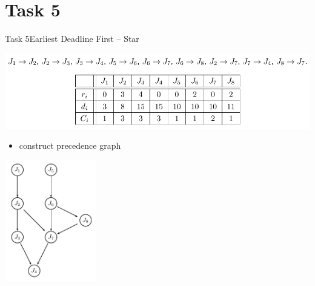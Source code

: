 
\section{Task 5}

\setcounter{task}{1}

\begin{frame}[allowframebreaks]{Task 5}{Earliest Deadline First – Star\vspace{0.5cm}}
  \begin{tasknoinc}
    \includegraphics[width=\textwidth]{./figures/5_task.png}
    \begin{itemize}
      \item construct \alert{precedence graph}
    \end{itemize}
  \end{tasknoinc}
  \begin{solution}
    \centering
    \includegraphics[width=0.3\textwidth]{./figures/5_graph.png}
  \end{solution}
\end{frame}

